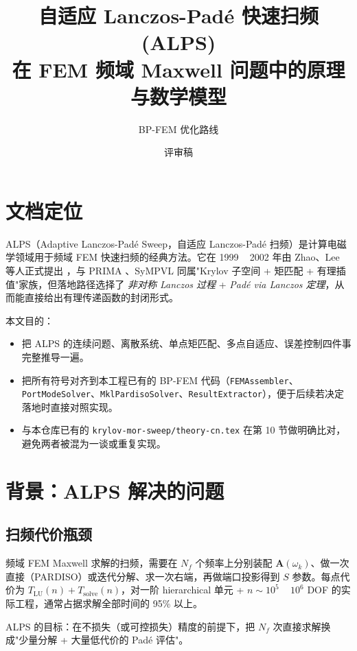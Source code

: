 \documentclass[11pt,a4paper]{ctexart}
\title{自适应 Lanczos-Padé 快速扫频 (ALPS) \\ 在 FEM 频域 Maxwell 问题中的原理与数学模型}
\author{BP-FEM 优化路线}
\date{评审稿}
\begin{document}
\maketitle
\tableofcontents
\bigskip

\section{文档定位}

ALPS（Adaptive Lanczos-Padé Sweep，自适应 Lanczos-Padé 扫频）是计算电磁学领域用于频域 FEM 快速扫频的经典方法。它在 1999 ~ 2002 年由 Zhao、Lee 等人正式提出 \cite{Zhao1999,Lee2002}，与 PRIMA \cite{Odabasioglu1998}、SyMPVL \cite{Freund2000} 同属"Krylov 子空间 + 矩匹配 + 有理插值"家族，但落地路径选择了 \emph{非对称 Lanczos 过程} + \emph{Padé via Lanczos 定理}，从而能直接给出有理传递函数的封闭形式。

本文目的：

\begin{itemize}
\item 把 ALPS 的连续问题、离散系统、单点矩匹配、多点自适应、误差控制四件事完整推导一遍。
\item 把所有符号对齐到本工程已有的 BP-FEM 代码（\texttt{FEMAssembler}、\texttt{PortModeSolver}、\texttt{MklPardisoSolver}、\texttt{ResultExtractor}），便于后续若决定落地时直接对照实现。
\item 与本仓库已有的 \texttt{krylov-mor-sweep/theory-cn.tex} 在第 10 节做明确比对，避免两者被混为一谈或重复实现。
\end{itemize}

\section{背景：ALPS 解决的问题}

\subsection{扫频代价瓶颈}

频域 FEM Maxwell 求解的扫频，需要在 $N_f$ 个频率上分别装配 $\bm A(\omega_k)$、做一次直接（PARDISO）或迭代分解、求一次右端，再做端口投影得到 $S$ 参数。每点代价为 $T_{\mathrm{LU}}(n)+T_{\mathrm{solve}}(n)$，对一阶 hierarchical 单元 + $n\!\sim\!10^5$ ~ $10^6$ DOF 的实际工程，通常占据求解全部时间的 95\% 以上。

ALPS 的目标：在不损失（或可控损失）精度的前提下，把 $N_f$ 次直接求解换成"少量分解 + 大量低代价的 Padé 评估"。
\end{document}
